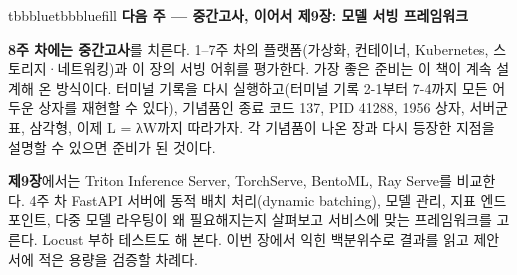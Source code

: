 \begin{calloutbox}{tbbblue}{tbbbluefill}
{\normalsize\bfseries\color{tbbblue}다음 주 — 중간고사, 이어서 제9장: 모델 서빙 프레임워크}\par\vspace{3pt}
\textbf{8주 차에는 중간고사}를 치른다. 1–7주 차의 플랫폼(가상화, 컨테이너, Kubernetes, 스토리지·네트워킹)과 이 장의 서빙 어휘를 평가한다. 가장 좋은 준비는 이 책이 계속 설계해 온 방식이다. 터미널 기록을 다시 실행하고(터미널 기록 2-1부터 7-4까지 모든 어두운 상자를 재현할 수 있다), 기념품인 종료 코드 137, PID 41288, 1956 상자, 서버군 표, 삼각형, 이제 L = λW까지 따라가자. 각 기념품이 나온 장과 다시 등장한 지점을 설명할 수 있으면 준비가 된 것이다.

\textbf{제9장}에서는 Triton Inference Server, TorchServe, BentoML, Ray Serve를 비교한다. 4주 차 FastAPI 서버에 동적 배치 처리(dynamic batching), 모델 관리, 지표 엔드포인트, 다중 모델 라우팅이 왜 필요해지는지 살펴보고 서비스에 맞는 프레임워크를 고른다. Locust 부하 테스트도 해 본다. 이번 장에서 익힌 백분위수로 결과를 읽고 제안서에 적은 용량을 검증할 차례다.
\end{calloutbox}
